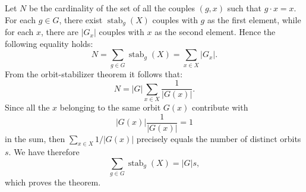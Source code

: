 \documentclass[12pt]{article}
\begin{document}
Let $N$ be the cardinality of the set of all the couples $(g,x)$ such that $g \cdot x = x$. For each $g \in G$, there exist $\operatorname{stab}_g(X)$ couples with $g$ as the first element, while for each $x$, there are $|G_x|$ couples with $x$ as the second element. Hence the following equality holds:
\[ N = \sum_{g \in G} \operatorname{stab}_g(X) = \sum_{x \in X} |G_x|. \] 
From the orbit-stabilizer theorem it follows that:
\[ N = |G| \sum_{x \in X} \frac{1}{|G(x)|}. \]
Since all the $x$ belonging to the same orbit $G(x)$ contribute with
\[ |G(x)| \frac{1}{|G(x)|} = 1 \]
in the sum, then $\sum_{x\in X} 1/|G(x)|$ precisely equals the number of distinct orbits $s$. We have therefore
\[ \sum_{g \in G} \operatorname{stab}_g(X) = |G| s, \]
which proves the theorem.
\end{document}
